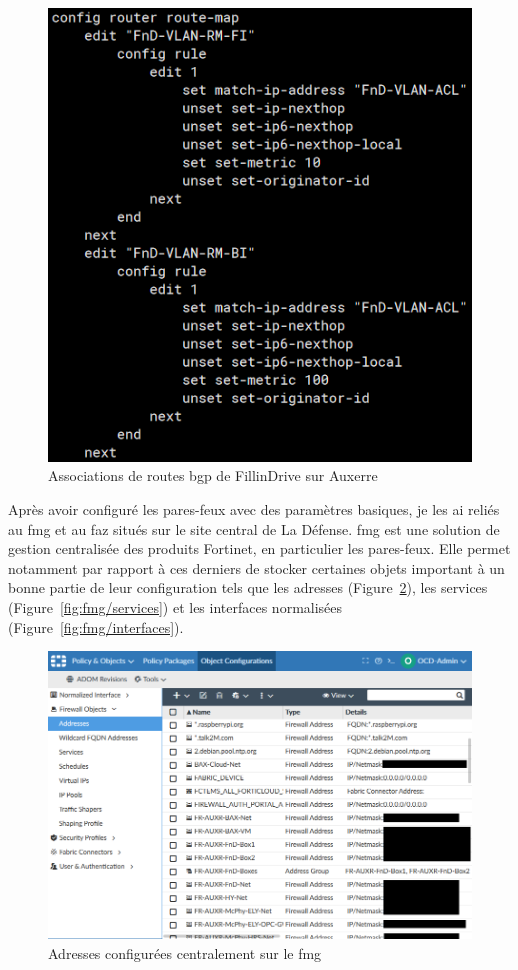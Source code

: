 \documentclass[12pt, oneside, a4paper, titlepage]{report}
\begin{document}
\begin{figure}[h!]
    \centering
    \includegraphics[width = 0.7\linewidth]{img/fgt-auxr/route-maps.png}
    \caption{Associations de routes \gls{bgp} de FillinDrive sur Auxerre}%
    \label{fig:fgt-auxr/route-maps}
\end{figure}
\FloatBarrier{}

Après avoir configuré les pares-feux avec des paramètres basiques, je les ai
reliés au \acrlong{fmg} et au \acrlong{faz} situés sur le site central de La
Défense. \acrfull{fmg} est une solution de gestion centralisée des produits
Fortinet, en particulier les pares-feux. Elle permet notamment par rapport à ces
derniers de stocker certaines objets important à un bonne partie de leur
configuration tels que les adresses (Figure~\ref{fig:fmg/addresses}), les
services (Figure~\ref{fig:fmg/services}) et les interfaces normalisées
(Figure~\ref{fig:fmg/interfaces}).

\begin{figure}[h!]
    \centering
    \includegraphics[width = \linewidth]{img/fmg/addresses.png}
    \caption{Adresses configurées centralement sur le \acrlong{fmg}}%
    \label{fig:fmg/addresses}
\end{figure}
\end{document}
